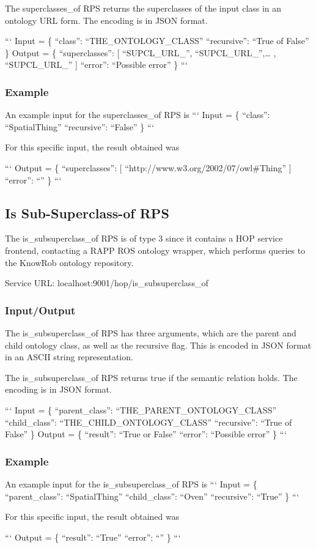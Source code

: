 The superclasses\-\_\-of R\-P\-S returns the superclasses of the input class in an ontology U\-R\-L form. The encoding is in J\-S\-O\-N format.

``` Input = \{ “class”\-: “\-T\-H\-E\-\_\-\-O\-N\-T\-O\-L\-O\-G\-Y\-\_\-\-C\-L\-A\-S\-S” “recursive”\-: “\-True of False” \} {\ttfamily  } Output = \{ “superclasses”\-: \mbox{[} “\-S\-U\-P\-C\-L\-\_\-\-U\-R\-L\-\_”, “\-S\-U\-P\-C\-L\-\_\-\-U\-R\-L\-\_”,… , “\-S\-U\-P\-C\-L\-\_\-\-U\-R\-L\-\_” \mbox{]} “error”\-: “\-Possible error” \} ``` \subsubsection*{Example}

An example input for the superclasses\-\_\-of R\-P\-S is ``` Input = \{ “class”\-: “\-Spatial\-Thing” “recursive”\-: “\-False” \} ```

For this specific input, the result obtained was

``` Output = \{ “superclasses”\-: \mbox{[} “http\-://www.w3.\-org/2002/07/owl\#\-Thing” \mbox{]} “error”\-: “” \} ```

\subsection*{Is Sub-\/\-Superclass-\/of R\-P\-S}

The is\-\_\-subsuperclass\-\_\-of R\-P\-S is of type 3 since it contains a H\-O\-P service frontend, contacting a R\-A\-P\-P R\-O\-S ontology wrapper, which performs queries to the Know\-Rob ontology repository.

Service U\-R\-L\-: {\ttfamily localhost\-:9001/hop/is\-\_\-subsuperclass\-\_\-of}

\subsubsection*{Input/\-Output}

The is\-\_\-subsuperclass\-\_\-of R\-P\-S has three arguments, which are the parent and child ontology class, as well as the recursive flag. This is encoded in J\-S\-O\-N format in an A\-S\-C\-I\-I string representation.

The is\-\_\-subsuperclass\-\_\-of R\-P\-S returns true if the semantic relation holds. The encoding is in J\-S\-O\-N format.

``` Input = \{ “parent\-\_\-class”\-: “\-T\-H\-E\-\_\-\-P\-A\-R\-E\-N\-T\-\_\-\-O\-N\-T\-O\-L\-O\-G\-Y\-\_\-\-C\-L\-A\-S\-S” “child\-\_\-class”\-: “\-T\-H\-E\-\_\-\-C\-H\-I\-L\-D\-\_\-\-O\-N\-T\-O\-L\-O\-G\-Y\-\_\-\-C\-L\-A\-S\-S” “recursive”\-: “\-True of False” \} {\ttfamily  } Output = \{ “result”\-: “\-True or False” “error”\-: “\-Possible error” \} ``` \subsubsection*{Example}

An example input for the is\-\_\-subsuperclass\-\_\-of R\-P\-S is ``` Input = \{ “parent\-\_\-class”\-: “\-Spatial\-Thing” “child\-\_\-class”\-: “\-Oven” “recursive”\-: “\-True” \} ```

For this specific input, the result obtained was

``` Output = \{ “result”\-: “\-True” “error”\-: “” \} ``` 